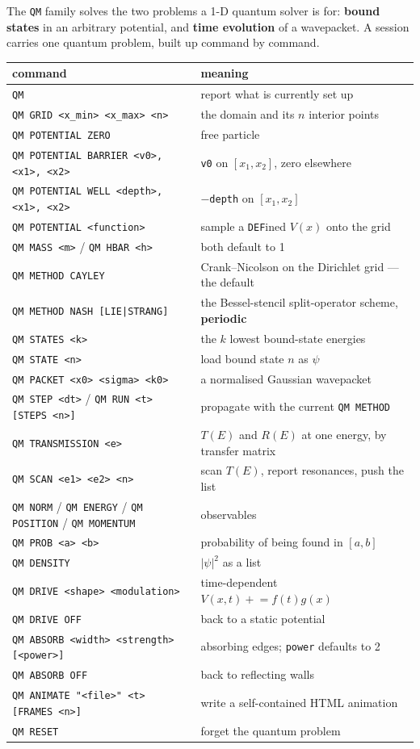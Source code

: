 \documentclass[11pt]{article}
\newcommand{\kw}[1]{\texttt{\uppercase{#1}}}
\newcommand{\code}[1]{\texttt{#1}}
\begin{document}
The \kw{qm} family solves the two problems a 1-D quantum solver is for:
\textbf{bound states} in an arbitrary potential, and \textbf{time
evolution} of a wavepacket. A session carries one quantum problem, built
up command by command.

\begin{center}
\begin{tabular}{lp{7.4cm}}
\textbf{command} & \textbf{meaning}\\
\hline
\code{QM} & report what is currently set up\\
\code{QM GRID <x\_min> <x\_max> <n>} & the domain and its $n$ interior points\\
\code{QM POTENTIAL ZERO} & free particle\\
\code{QM POTENTIAL BARRIER <v0>, <x1>, <x2>} & \code{v0} on $[x_1,x_2]$, zero elsewhere\\
\code{QM POTENTIAL WELL <depth>, <x1>, <x2>} & $-$\code{depth} on $[x_1,x_2]$\\
\code{QM POTENTIAL <function>} & sample a \kw{def}ined $V(x)$ onto the grid\\
\code{QM MASS <m>} / \code{QM HBAR <h>} & both default to 1\\
\code{QM METHOD CAYLEY} & Crank--Nicolson on the Dirichlet grid --- the default\\
\code{QM METHOD NASH [LIE|STRANG]} & the Bessel-stencil split-operator scheme, \textbf{periodic}\\
\code{QM STATES <k>} & the $k$ lowest bound-state energies\\
\code{QM STATE <n>} & load bound state $n$ as $\psi$\\
\code{QM PACKET <x0> <sigma> <k0>} & a normalised Gaussian wavepacket\\
\code{QM STEP <dt>} / \code{QM RUN <t> [STEPS <n>]} & propagate with the current \code{QM METHOD}\\
\code{QM TRANSMISSION <e>} & $T(E)$ and $R(E)$ at one energy, by transfer matrix\\
\code{QM SCAN <e1> <e2> <n>} & scan $T(E)$, report resonances, push the list\\
\code{QM NORM} / \code{QM ENERGY} / \code{QM POSITION} / \code{QM MOMENTUM} & observables\\
\code{QM PROB <a> <b>} & probability of being found in $[a,b]$\\
\code{QM DENSITY} & $|\psi|^2$ as a list\\
\code{QM DRIVE <shape> <modulation>} & time-dependent $V(x,t) \mathrel{+}= f(t)g(x)$\\
\code{QM DRIVE OFF} & back to a static potential\\
\code{QM ABSORB <width> <strength> [<power>]} & absorbing edges; \code{power} defaults to 2\\
\code{QM ABSORB OFF} & back to reflecting walls\\
\code{QM ANIMATE "<file>" <t> [FRAMES <n>]} & write a self-contained HTML animation\\
\code{QM RESET} & forget the quantum problem\\
\end{tabular}
\end{center}
\end{document}
